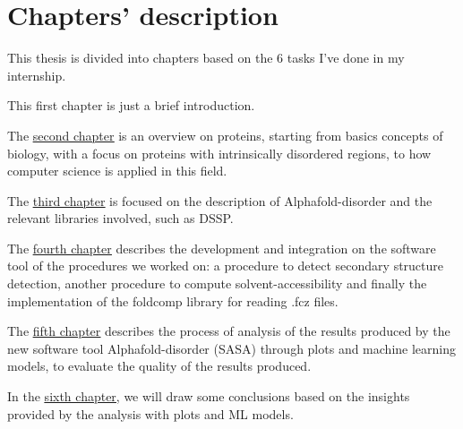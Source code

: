 \section{Chapters' description}
This thesis is divided into chapters based on the 6 tasks I've done in my internship.

This first chapter is just a brief introduction.

The \underline{\hyperref[chp:proteins]{second chapter}} is an overview on proteins, starting from basics concepts of biology, with a focus on proteins with intrinsically disordered regions, to how computer science is applied in this field.

The \underline{\hyperref[chp:alphafold-disorder]{third chapter}} is focused on the description of Alphafold-disorder and the relevant libraries involved, such as DSSP.

The \underline{\hyperref[chp:development]{fourth chapter}} describes the development and integration on the software tool of the procedures we worked on: a procedure to detect secondary structure detection, another procedure to compute solvent-accessibility and finally the implementation of the foldcomp library for reading .fcz files.




The \underline{\hyperref[chp:analysis]{fifth chapter}} describes the process of analysis of the results produced by the new software tool Alphafold-disorder (SASA) through plots and machine learning models, to evaluate the quality of the results produced.

In the \underline{\hyperref[chp:conclusions]{sixth chapter}}, we will draw some conclusions based on the insights provided by the analysis with plots and ML models.

